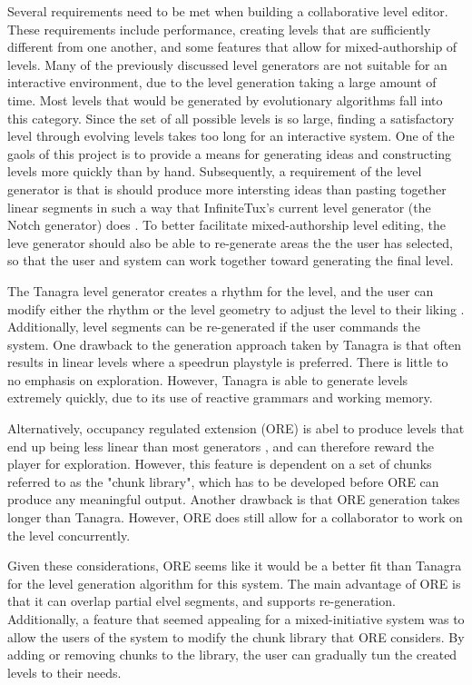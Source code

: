 
Several requirements need to be met when building a collaborative level editor. These
requirements include performance, creating levels that are sufficiently different from one
another, and some features that allow for mixed-authorship of levels. Many of the previously
discussed level generators are not suitable for an interactive environment, due to the 
level generation taking a large amount of time. Most levels that would be generated by
evolutionary algorithms fall into this category. Since the set of all possible levels is so
large, finding a satisfactory level through evolving levels takes too long for an
interactive system. One of the gaols of this project is to provide a means for generating
ideas and constructing levels more quickly than by hand. Subsequently, a requirement of the
level generator is that is should produce more intersting ideas than pasting together linear
segments in such a way that InfiniteTux's current level generator (the Notch generator) does
\cite{shaker2016}. To better facilitate mixed-authorship level editing, the leve generator
should also be able to re-generate areas the the user has selected, so that the user and
system can work together toward generating the final level.

The Tanagra level generator creates a rhythm for the level, and the user can modify either
the rhythm or the level geometry to adjust the level to their liking \cite{smith2010}.
Additionally, level segments can be re-generated if the user commands the system. One
drawback to the generation approach taken by Tanagra is that often results in linear levels
where a speedrun playstyle is preferred. There is little to no emphasis on exploration.
However, Tanagra is able to generate levels extremely quickly, due to its use of reactive
grammars and working memory.

Alternatively, occupancy regulated extension (ORE) is abel to produce levels that end up
being less linear than most generators \cite{mawhorter2010, shaker2011}, and can therefore
reward the player for exploration. However, this feature is dependent on a set of chunks 
referred to as the "chunk library", which has to be developed before ORE can produce
any meaningful output. Another drawback is that ORE generation takes longer than Tanagra.
However, ORE does still allow for a collaborator to work on the level concurrently.

Given these considerations, ORE seems like it would be a better fit than Tanagra for the
level generation algorithm for this system. The main advantage of ORE is that it can overlap
partial elvel segments, and supports re-generation. Additionally, a feature that seemed
appealing for a mixed-initiative system was to allow the users of the system to modify the
chunk library that ORE considers. By adding or removing chunks to the library, the user
can gradually tun the created levels to their needs.

